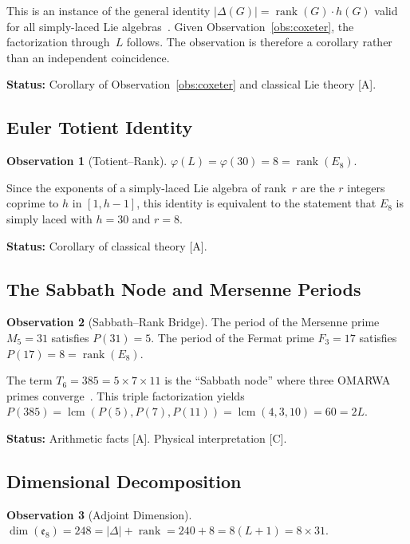 \documentclass[11pt, a4paper]{article}
\theoremstyle{plain}
\theoremstyle{definition}
\newtheorem{observation}{Observation}[section]
\theoremstyle{remark}
\DeclareMathOperator{\lcm}{lcm}
\DeclareMathOperator{\rank}{rank}
\begin{document}
This is an instance of the general identity
$|\Delta(G)| = \rank(G) \cdot h(G)$ valid for all simply-laced Lie
algebras~\cite{humphreys}. Given Observation~\ref{obs:coxeter},
the factorization through~$L$ follows. The observation is therefore
a corollary rather than an independent coincidence.

\textbf{Status:} Corollary of Observation~\ref{obs:coxeter} and
classical Lie theory [A].

\subsection{Euler Totient Identity}

\begin{observation}[Totient--Rank]
\label{obs:totient}
$\varphi(L) = \varphi(30) = 8 = \rank(E_8)$.
\end{observation}

Since the exponents of a simply-laced Lie algebra of rank~$r$ are the
$r$ integers coprime to $h$ in $[1, h-1]$, this identity is equivalent
to the statement that $E_8$ is simply laced with $h = 30$ and $r = 8$.

\textbf{Status:} Corollary of classical theory [A].

\subsection{The Sabbath Node and Mersenne Periods}

\begin{observation}[Sabbath--Rank Bridge]
\label{obs:sabbath}
The period of the Mersenne prime $M_5 = 31$ satisfies
$P(31) = 5$. The period of the Fermat prime $F_3 = 17$ satisfies
$P(17) = 8 = \rank(E_8)$.
\end{observation}

The term $T_6 = 385 = 5 \times 7 \times 11$ is the ``Sabbath node''
where three OMARWA primes converge~\cite{paket2}. This triple
factorization yields $P(385) = \lcm(P(5), P(7), P(11)) =
\lcm(4, 3, 10) = 60 = 2L$.

\textbf{Status:} Arithmetic facts [A]. Physical interpretation [C].

\subsection{Dimensional Decomposition}

\begin{observation}[Adjoint Dimension]
\label{obs:dim}
$\dim(\mathfrak{e}_8) = 248 = |\Delta| + \rank = 240 + 8 = 8(L+1) =
8 \times 31$.
\end{observation}
\end{document}
